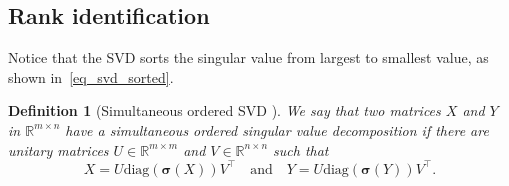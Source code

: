 \documentclass[twoside,11pt]{article}
\newtheorem{Def}{Definition}
\numberwithin{equation}{section}
\begin{document}
\subsection{Rank identification}
Notice that the SVD sorts the singular value from largest to smallest value, as shown in~\eqref{eq_svd_sorted}. 
\begin{Def}[Simultaneous ordered SVD \cite{NA_sgv_1}] We say that two matrices $X $ and $Y $ in $\mathbb{R}^{m\times n} $ have a simultaneous ordered singular value decomposition if there are unitary matrices $U\in\mathbb{R}^{m\times m} $ and $V\in\mathbb{R}^{n\times n} $ such that 
  \begin{equation*}
    X=U\mathrm{diag} (\bm{\sigma} (X))V^{\top} \quad\text{and}\quad Y=U\mathrm{diag} (\bm{\sigma} (Y))V^{\top}.
  \end{equation*}
\end{Def}
\end{document}
